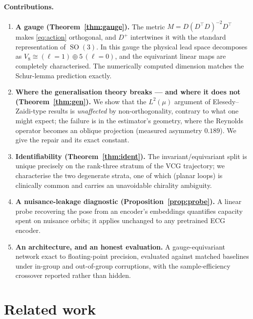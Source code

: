 \documentclass[11pt]{article}
\theoremstyle{definition}
\DeclareMathOperator{\SO}{SO}
\newcommand{\Veight}{V_{8}}
\begin{document}
\paragraph{Contributions.}
\begin{enumerate}\itemsep2pt
\item \textbf{A gauge (Theorem~\ref{thm:gauge}).} The metric $M = D(D^{\top}D)^{-2}D^{\top}$
  makes \eqref{eq:action} orthogonal, and $D^{+}$ intertwines it with the standard
  representation of $\SO(3)$. In this gauge the physical lead space decomposes as
  $\Veight \cong (\ell{=}1) \oplus 5\,(\ell{=}0)$, and the equivariant linear maps are
  completely characterised. The numerically computed dimension matches the
  Schur-lemma prediction exactly.
\item \textbf{Where the generalisation theory breaks --- and where it does not
  (Theorem~\ref{thm:gen}).} We show that the $L^2(\mu)$ argument of
  Elesedy--Zaidi-type results is \emph{unaffected} by non-orthogonality, contrary to
  what one might expect; the failure is in the estimator's geometry, where the
  Reynolds operator becomes an oblique projection (measured asymmetry $0.189$). We
  give the repair and its exact constant.
\item \textbf{Identifiability (Theorem~\ref{thm:ident}).} The invariant/equivariant
  split is unique precisely on the rank-three stratum of the VCG trajectory; we
  characterise the two degenerate strata, one of which (planar loops) is clinically
  common and carries an unavoidable chirality ambiguity.
\item \textbf{A nuisance-leakage diagnostic (Proposition~\ref{prop:probe}).} A linear
  probe recovering the pose from an encoder's embeddings quantifies capacity spent on
  nuisance orbits; it applies unchanged to any pretrained ECG encoder.
\item \textbf{An architecture, and an honest evaluation.} A gauge-equivariant network
  exact to floating-point precision, evaluated against matched baselines under
  in-group and out-of-group corruptions, with the sample-efficiency crossover
  reported rather than hidden.
\end{enumerate}

\section{Related work}
\end{document}
